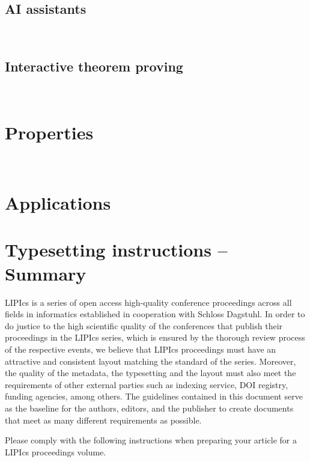 \documentclass[a4paper,UKenglish,cleveref, autoref, thm-restate]{lipics-v2021}
\begin{document}
~

\subsection{AI assistants}

~

\subsection{Interactive theorem proving}

~

\newpage

\section{Properties}
\label{sec:properties}

~

\section{Applications}
\label{sec:applications}


\cite{rein-2019-exploratory}

\newpage



\newpage

\section{Typesetting instructions -- Summary}
\label{sec:typesetting-summary}

LIPIcs is a series of open access high-quality conference proceedings across all fields in informatics established in cooperation with Schloss Dagstuhl.
In order to do justice to the high scientific quality of the conferences that publish their proceedings in the LIPIcs series, which is ensured by the thorough review process of the respective events, we believe that LIPIcs proceedings must have an attractive and consistent layout matching the standard of the series.
Moreover, the quality of the metadata, the typesetting and the layout must also meet the requirements of other external parties such as indexing service, DOI registry, funding agencies, among others. The guidelines contained in this document serve as the baseline for the authors, editors, and the publisher to create documents that meet as many different requirements as possible.

Please comply with the following instructions when preparing your article for a LIPIcs proceedings volume.
\end{document}
